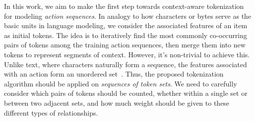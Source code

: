 In this work, we aim to make the first step towards context-aware tokenization for modeling \emph{action sequences}. In analogy to how characters or bytes serve as the basic units in language modeling, we consider the associated features of an item as initial tokens.
The idea is to iteratively find the most commonly co-occurring pairs of tokens among the training action sequences, then merge them into new tokens to represent segments of context. However, it's non-trivial to achieve this. Unlike text, where characters naturally form a sequence, the features associated with an action form an unordered set~\cite{zhang2019fdsa,zhou2020s3}. Thus, the proposed tokenization algorithm should be applied on \emph{sequences of token sets}.
We need to carefully consider which pairs of tokens should be counted, whether within a single set or between two adjacent sets, and how much weight should be given to these different types of relationships.

